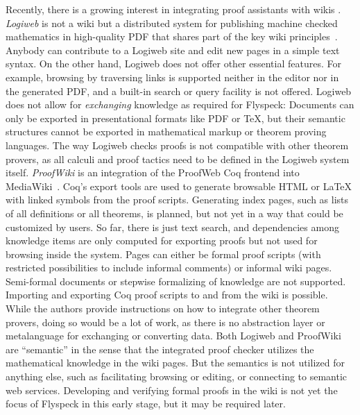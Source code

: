 \begin{background}
Recently, there is a growing interest in integrating proof assistants with
wikis%
.  \emph{Logiweb} is not a wiki but a distributed system for publishing machine
checked mathematics in high-quality PDF that shares part of the key wiki
principles~\cite{Grue:Logiweb07}.  Anybody can contribute to a Logiweb site and
edit new pages in a simple text syntax.  On the other hand, Logiweb does not
offer other essential features.  For example, browsing by traversing links is
supported neither in the editor nor in the generated PDF, and a built-in search
or query facility is not offered.  Logiweb does not allow for \emph{exchanging}
knowledge as required for Flyspeck: Documents can only be exported in
presentational formats like PDF or \TeX{}, but their semantic structures
cannot be exported in mathematical markup or theorem proving languages.  The way
Logiweb checks proofs is not compatible with other theorem provers, as all
calculi and proof tactics need to be defined in the Logiweb system itself.
\emph{ProofWiki} is an integration of the ProofWeb Coq frontend into
MediaWiki~\cite{CorKal:CoopReposFormalProofs07}.  Coq's export tools are used to
generate browsable HTML or {\LaTeX} with linked symbols from the proof scripts.
Generating index pages, such as lists of all definitions or all theorems, is
planned, but not yet in a way that could be customized by users.  So far, there
is just text search, and dependencies among knowledge items are only computed
for exporting proofs but not used for browsing inside the system.  Pages can
either be formal proof scripts (with restricted possibilities to include
informal comments) or informal wiki pages.  Semi-formal documents or stepwise
formalizing of knowledge are not supported.  Importing and exporting Coq proof
scripts to and from the wiki is possible.  While the authors provide
instructions on how to integrate other theorem provers, doing so would be a lot
of work, as there is no abstraction layer or metalanguage for exchanging or
converting data.  Both Logiweb and ProofWiki are ``semantic'' in the sense that
the integrated proof checker utilizes the mathematical knowledge in the wiki
pages.  But the semantics is not utilized for anything else, such as
facilitating browsing or editing, or connecting to semantic web services.
Developing and verifying formal proofs in the wiki is not yet the focus of
Flyspeck in this early stage, but it may be required later.
\end{background}


